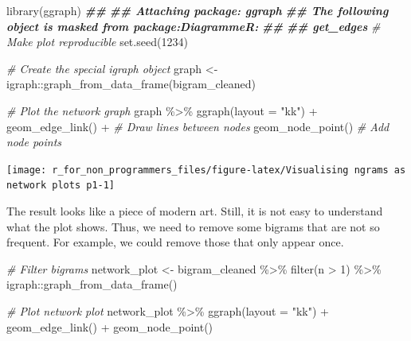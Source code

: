 \documentclass[
]{book}
\newenvironment{Shaded}{\begin{snugshade}}{\end{snugshade}}
\newcommand{\AttributeTok}[1]{\textcolor[rgb]{0.77,0.63,0.00}{#1}}
\newcommand{\CommentTok}[1]{\textcolor[rgb]{0.56,0.35,0.01}{\textit{#1}}}
\newcommand{\DecValTok}[1]{\textcolor[rgb]{0.00,0.00,0.81}{#1}}
\newcommand{\DocumentationTok}[1]{\textcolor[rgb]{0.56,0.35,0.01}{\textbf{\textit{#1}}}}
\newcommand{\FunctionTok}[1]{\textcolor[rgb]{0.00,0.00,0.00}{#1}}
\newcommand{\NormalTok}[1]{#1}
\newcommand{\OtherTok}[1]{\textcolor[rgb]{0.56,0.35,0.01}{#1}}
\newcommand{\SpecialCharTok}[1]{\textcolor[rgb]{0.00,0.00,0.00}{#1}}
\newcommand{\StringTok}[1]{\textcolor[rgb]{0.31,0.60,0.02}{#1}}
\begin{document}
\begin{Shaded}
\begin{Highlighting}[]
\FunctionTok{library}\NormalTok{(ggraph)}
\DocumentationTok{\#\# }
\DocumentationTok{\#\# Attaching package: \textquotesingle{}ggraph\textquotesingle{}}
\DocumentationTok{\#\# The following object is masked from \textquotesingle{}package:DiagrammeR\textquotesingle{}:}
\DocumentationTok{\#\# }
\DocumentationTok{\#\#     get\_edges}
\CommentTok{\# Make plot reproducible}
\FunctionTok{set.seed}\NormalTok{(}\DecValTok{1234}\NormalTok{)}

\CommentTok{\# Create the special igraph object}
\NormalTok{graph }\OtherTok{\textless{}{-}}\NormalTok{ igraph}\SpecialCharTok{::}\FunctionTok{graph\_from\_data\_frame}\NormalTok{(bigram\_cleaned)}

\CommentTok{\# Plot the network graph}
\NormalTok{graph }\SpecialCharTok{\%\textgreater{}\%}
  \FunctionTok{ggraph}\NormalTok{(}\AttributeTok{layout =} \StringTok{"kk"}\NormalTok{) }\SpecialCharTok{+}
  \FunctionTok{geom\_edge\_link}\NormalTok{() }\SpecialCharTok{+}    \CommentTok{\# Draw lines between nodes}
  \FunctionTok{geom\_node\_point}\NormalTok{()     }\CommentTok{\# Add node points}
\end{Highlighting}
\end{Shaded}

\begin{center}\texttt{[image: r\_for\_non\_programmers\_files/figure-latex/Visualising ngrams as network plots p1-1]} \end{center}

The result looks like a piece of modern art. Still, it is not easy to understand what the plot shows. Thus, we need to remove some bigrams that are not so frequent. For example, we could remove those that only appear once.

\begin{Shaded}
\begin{Highlighting}[]
\CommentTok{\# Filter bigrams}
\NormalTok{network\_plot }\OtherTok{\textless{}{-}}\NormalTok{ bigram\_cleaned }\SpecialCharTok{\%\textgreater{}\%}
  \FunctionTok{filter}\NormalTok{(n }\SpecialCharTok{\textgreater{}} \DecValTok{1}\NormalTok{) }\SpecialCharTok{\%\textgreater{}\%}
\NormalTok{  igraph}\SpecialCharTok{::}\FunctionTok{graph\_from\_data\_frame}\NormalTok{()}

\CommentTok{\# Plot network plot}
\NormalTok{network\_plot }\SpecialCharTok{\%\textgreater{}\%}
  \FunctionTok{ggraph}\NormalTok{(}\AttributeTok{layout =} \StringTok{"kk"}\NormalTok{) }\SpecialCharTok{+}
  \FunctionTok{geom\_edge\_link}\NormalTok{() }\SpecialCharTok{+}
  \FunctionTok{geom\_node\_point}\NormalTok{()}
\end{Highlighting}
\end{Shaded}
\end{document}
